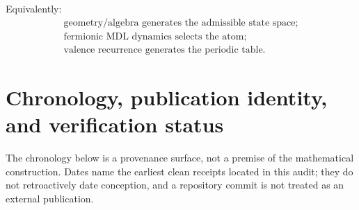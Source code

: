 \documentclass[11pt,a4paper]{article}
\theoremstyle{remark}
\begin{document}
Equivalently:
\[
\boxed{\begin{gathered}
\text{geometry/algebra generates the admissible state space;}\\
\text{fermionic MDL dynamics selects the atom;}\\
\text{valence recurrence generates the periodic table.}
\end{gathered}}
\]

\section{Chronology, publication identity, and verification status}

The chronology below is a provenance surface, not a premise of the mathematical
construction.  Dates name the earliest clean receipts located in this audit;
they do not retroactively date conception, and a repository commit is not treated
as an external publication.
\end{document}
